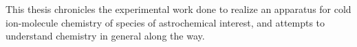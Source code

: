 This thesis chronicles the experimental work done to realize an apparatus for cold ion-molecule chemistry of species of astrochemical interest, and attempts to understand chemistry in general along the way.
